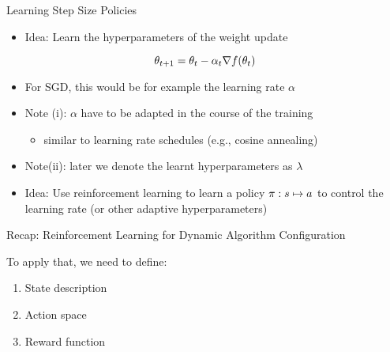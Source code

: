 	
\begin{frame}[c]{Learning Step Size Policies }

\begin{itemize}
\item \alert{Idea:} Learn the hyperparameters of the weight update 
\end{itemize}

\begin{equation}
\theta_{t+1} = \theta_t - \alpha_t \nabla f(\theta_t) \nonumber
\end{equation}

\begin{itemize}
\pause
\item For SGD, this would be for example the learning rate $\alpha$
\pause
\item \alert{Note (i)}: $\alpha$ have to be adapted in the course of the training
\begin{itemize}
\item similar to learning rate schedules (e.g., cosine annealing)
\end{itemize}
\pause
\item \alert{Note(ii)}: later we denote the learnt hyperparameters as $\lambda$
\medskip
\pause
\item \alert{Idea:} Use reinforcement learning to learn a policy $\pi: s \mapsto a$ to control the learning rate (or other adaptive hyperparameters)
\end{itemize}



\end{frame}
\begin{frame}[c]{Recap: Reinforcement Learning for Dynamic Algorithm Configuration}

\centering


\bigskip
To apply that, we need to define:
\begin{enumerate}
	\item State description
	\item Action space
	\item Reward function
\end{enumerate}

\end{frame}

